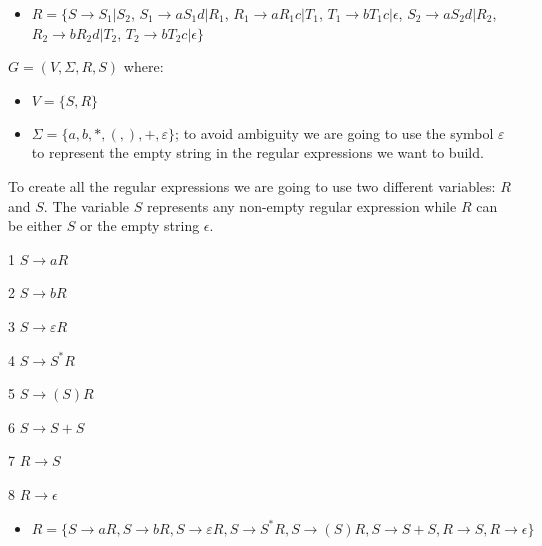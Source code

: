 \documentclass[11pt]{article}
\newcommand{\question}[2] {\vspace{0.3in}\noindent{\subsection*{Question #1. #2} \vspace{0.15in}}}
\begin{document}
\begin{itemize}    
    \item{$R = \{S \rightarrow S_1 | S_2$, 
        $S_1 \rightarrow aS_1d | R_1$,
        $R_1 \rightarrow aR_1c | T_1$,
        $T_1 \rightarrow bT_1c | \epsilon$,
        $S_2 \rightarrow aS_2d | R_2$,
        $R_2 \rightarrow bR_2d | T_2$,
        $T_2 \rightarrow bT_2c | \epsilon\}$
      }
\end{itemize}




\question{4}{}
$G = (V, \Sigma, R, S)$ where:
\begin{itemize}
    \item{$V = \{S, R\}$}
    \item{$\Sigma = \{a, b, *, (, ), +, \varepsilon \}$}; to avoid ambiguity we are going to use the symbol $\varepsilon$ to represent the empty string in the regular expressions we want to build.
\end{itemize}

\par To create all the regular expressions we are going to use two different variables: $R$ and $S$. The variable $S$ represents any non-empty regular expression while $R$ can be either $S$ or the empty string $\epsilon$.

\par 1 $S \rightarrow aR$
\par 2 $S \rightarrow bR$
\par 3 $S \rightarrow \varepsilon R$
\par 4 $S \rightarrow S^*R$
\par 5 $S \rightarrow (S)R$
\par 6 $S \rightarrow S + S$
\par 7 $R \rightarrow S$
\par 8 $R \rightarrow \epsilon$
\begin{itemize}    
    \item{$R = \{
        S \rightarrow aR, 
        S \rightarrow bR, 
        S \rightarrow \varepsilon R,
        S \rightarrow S^*R, 
        S \rightarrow (S)R,
        S \rightarrow S + S,
        R \rightarrow S,
        R \rightarrow \epsilon
    \}$
    }
\end{itemize}
\end{document}

